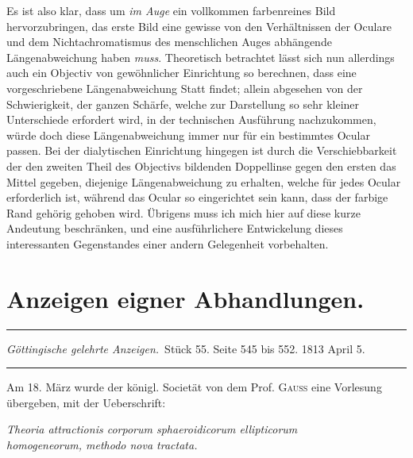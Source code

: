 \documentclass[11pt,a4paper]{article}
\begin{document}
Es ist also klar, dass um \textit{im Auge} ein vollkommen farbenreines Bild hervorzubringen, das erste Bild eine gewisse von den Verhältnissen der Oculare und dem Nichtachromatismus des menschlichen Auges abhängende Längenabweichung haben \textit{muss}. Theoretisch betrachtet lässt sich nun allerdings auch ein Objectiv von gewöhnlicher Einrichtung so berechnen, dass eine vorgeschriebene Längenabweichung Statt findet; allein abgesehen von der Schwierigkeit, der ganzen Schärfe, welche zur Darstellung so sehr kleiner Unterschiede erfordert wird, in der technischen Ausführung nachzukommen, würde doch diese Längenabweichung immer nur für ein bestimmtes Ocular passen. Bei der dialytischen Einrichtung hingegen ist durch die Verschiebbarkeit der den zweiten Theil des Objectivs bildenden Doppellinse gegen den ersten das Mittel gegeben, diejenige Längenabweichung zu erhalten, welche für jedes Ocular erforderlich ist, während das Ocular so eingerichtet sein kann, dass der farbige Rand gehörig gehoben wird. Übrigens muss ich mich hier auf diese kurze Andeutung beschränken, und eine ausführlichere Entwickelung dieses interessanten Gegenstandes einer andern Gelegenheit vorbehalten.


\section*{Anzeigen eigner Abhandlungen.}

\bigskip
\begin{center}
\rule{0.8\textwidth}{0.4pt}

\smallskip
\textit{Göttingische gelehrte Anzeigen.}\ Stück 55. Seite 545 bis 552. 1813 April 5.
\smallskip
\rule{0.8\textwidth}{0.4pt}
\end{center}

\bigskip\noindent
Am 18. März wurde der königl. Societät von dem Prof. \textsc{Gauss} eine Vorlesung übergeben, mit der Ueberschrift:

\begin{center}
\textit{Theoria attractionis corporum sphaeroidicorum ellipticorum}\\
\textit{homogeneorum, methodo nova tractata.}
\end{center}
\end{document}
